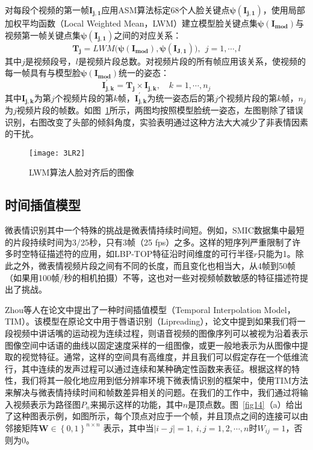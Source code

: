 对每段个视频的第一帧$\boldsymbol{I_{j,1}}$应用ASM算法标定68个人脸关键点$\boldsymbol{\psi (I_{j,1})}$，使用局部加权平均函数（Local Weighted Mean，LWM）建立模型脸关键点集$\boldsymbol{\psi (I_{mod})}$与视频第一帧关键点集$\boldsymbol{\psi (I_{j,1})}$之间的对应关系\citep{goshtasby1988image}：
\begin{equation}
    \label{eq3}
    \boldsymbol{T_{j}}=LWM(\boldsymbol{\psi (I_{mod})},\boldsymbol{\psi (I_{J,1}))},~~j=1,\cdots ,l
\end{equation}
其中$j$是视频段号，$l$是视频片段总数。对视频片段的所有帧应用该关系，使视频的每一帧具有与模型脸$\boldsymbol{\psi (I_{mod})}$统一的姿态：
\begin{equation}
    \label{eq4}
    \boldsymbol{I_{j,k}^{'}}=\boldsymbol{T_{j}}\times \boldsymbol{I_{j,k}},\quad k=1,\cdots ,n_{j}
\end{equation}
其中$\boldsymbol{I_{j,k}}$为第$j$个视频片段的第$k$帧，$\boldsymbol{I_{j,k}^{'}}$为统一姿态后的第$j$个视频片段的第$k$帧，$n_{j}$为$j$视频片段的帧数。如图~\ref{fig13}所示，两图均按照模型脸统一姿态，左图剔除了错误识别，右图改变了头部的倾斜角度，实验表明通过这种方法大大减少了非表情因素的干扰。

\begin{figure}[!htbp]
\centering
\texttt{[image: 3LR2]}
\caption{LWM算法人脸对齐后的图像}
\label{fig13}
\end{figure}

\subsection{时间插值模型}

微表情识别其中一个特殊的挑战是微表情持续时间短。例如，SMIC数据集中最短的片段持续时间为3/25秒，只有3帧（25 fps）之多。这样的短序列严重限制了许多时空特征描述符的应用，如LBP-TOP特征沿时间维度的可行半径$r$只能为1。除此之外，微表情视频片段之间有不同的长度，而且变化也相当大，从4帧到50帧（如果用100帧/秒的相机拍摄）不等，这也对一些对视频帧数敏感的特征描述符提出了挑战。

Zhou等人在论文中提出了一种时间插值模型（Temporal Interpolation Model，TIM）。该模型在原论文中用于唇语识别（Lipreading），论文中提到如果我们将一段视频中讲话嘴的运动视为连续过程，则语音视频的图像序列可以被视为沿着表示图像空间中话语的曲线以固定速度采样的一组图像，或更一般地表示为从图像中提取的视觉特征。通常，这样的空间具有高维度，并且我们可以假定存在一个低维流行，其中连续的发声过程可以通过连续和某种确定性函数来表征。根据这样的特性，我们将其一般化地应用到低分辨率环境下微表情识别的框架中，使用TIM方法来解决与微表情持续时间和帧数差异相关的问题。在我们的工作中，我们通过将输入视频表示为路径图$P_{n}$来揭示这样的功能，其中$n$是顶点数。图~\ref{fig14}（a）给出了这种图表示例，如图所示，每个顶点对应于一个帧，并且顶点之间的连接可以由邻接矩阵$\boldsymbol{W}\in \left \{ 0,1 \right \}^{n\times n}$ 表示，其中当$\left | i-j \right |= 1,~ i,j=1,2,\cdots ,n$时$W_{ij}= 1$，否则为0。

